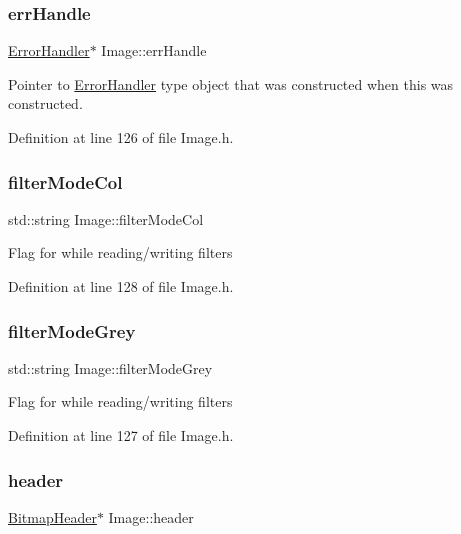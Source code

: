 \subsubsection{\texorpdfstring{errHandle}{errHandle}}
{\footnotesize\ttfamily \mbox{\hyperlink{classErrorHandler}{Error\+Handler}}$\ast$ Image\+::err\+Handle\hspace{0.3cm}{\ttfamily [protected]}}

Pointer to \mbox{\hyperlink{classErrorHandler}{Error\+Handler}} type object that was constructed when this was constructed. 

Definition at line 126 of file Image.\+h.

\mbox{\label{classImage_a0b4e4d5994ff72c9f3c99913037c627f}} 
\subsubsection{\texorpdfstring{filterModeCol}{filterModeCol}}
{\footnotesize\ttfamily std\+::string Image\+::filter\+Mode\+Col\hspace{0.3cm}{\ttfamily [protected]}}

Flag for while reading/writing filters 

Definition at line 128 of file Image.\+h.

\mbox{\label{classImage_aa05610d5ebee3b0fce0463d2a0b1323f}} 
\subsubsection{\texorpdfstring{filterModeGrey}{filterModeGrey}}
{\footnotesize\ttfamily std\+::string Image\+::filter\+Mode\+Grey\hspace{0.3cm}{\ttfamily [protected]}}

Flag for while reading/writing filters 

Definition at line 127 of file Image.\+h.

\mbox{\label{classImage_adaf72c2df8979eafb4031dc0384dc49f}} 
\subsubsection{\texorpdfstring{header}{header}}
{\footnotesize\ttfamily \mbox{\hyperlink{classBitmapHeader}{Bitmap\+Header}}$\ast$ Image\+::header\hspace{0.3cm}{\ttfamily [protected]}}


